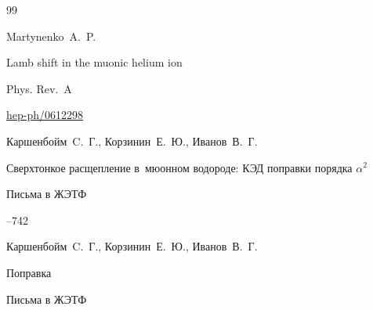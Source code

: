 \begin{thebibliography}{99}

\by Martynenko~A.~P.

\paper Lamb shift in the muonic helium ion

\jour Phys. Rev.~A






\arxiv \href{http://arxiv.org/abs/hep-ph/0612298}{hep-ph/0612298}




\by Каршенбойм~C.~Г., Корзинин~Е.~Ю., Иванов~В.~Г.

\paper Сверхтонкое расщепление в~мюонном водороде: КЭД поправки порядка $\alpha^2$

\jour Письма в ЖЭТФ




--742


\morerref

\by Каршенбойм~C.~Г., Корзинин~Е.~Ю., Иванов~В.~Г.

\paper Поправка

\jour Письма в ЖЭТФ
















\end{thebibliography}
